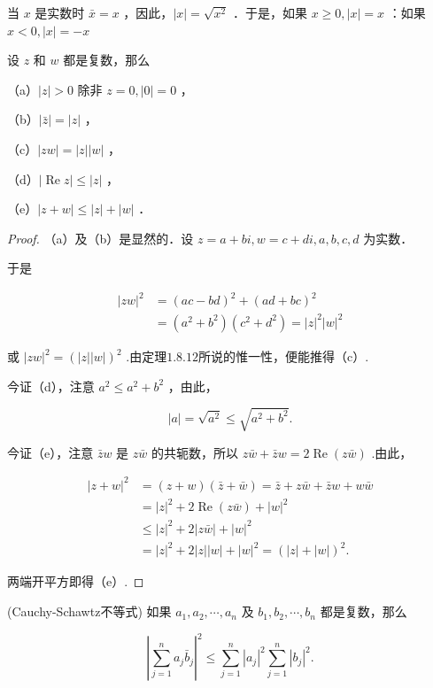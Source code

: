 \begin{remark}
	当 $x$ 是实数时 $\bar{x}=x$ ，因此，$|x|=\sqrt{x^2}$ ．于是，如果 $x \geqslant 0,|x|=x$ ：如果 $x<0,|x|=-x$
\end{remark} 
\begin{proposition}
		设 $z$ 和 $w$ 都是复数，那么
	
	（a）$|z|>0$ 除非 $z=0,|0|=0$ ，
	
	（b）$|\bar{z}|=|z|$ ，
	
	（c）$|z w|=|z||w|$ ，
	
	（d）$|\operatorname{Re} z| \leqslant|z|$ ，
	
	（e）$|z+w| \leqslant|z|+|w|$ ．
\end{proposition}

\begin{proof}
	（a）及（b）是显然的．设 $z=a+b i, w=c+d i, a, b, c, d$ 为实数．
	
	于是
	
	$$
	\begin{aligned}
		|z w|^2 & =(a c-b d)^2+(a d+b c)^2 \\
		& =\left(a^2+b^2\right)\left(c^2+d^2\right)=|z|^2|w|^2
	\end{aligned}
	$$
	
	
	或 $|z w|^2=(|z||w|)^2$ .由定理$1.8.12$所说的惟一性，便能推得（c）.
	
	今证（d），注意 $a^2 \leqslant a^2+b^2$ ，由此，
	
	$$
	|a|=\sqrt{a^2} \leqslant \sqrt{a^2+b^2} .
	$$
	
	
	今证（e），注意 $\bar{z} w$ 是 $z \bar{w}$ 的共轭数，所以 $z \bar{w}+\bar{z} w=2 \operatorname{Re}(z \bar{w})$ .由此，
	
	$$
	\begin{aligned}
		|z+w|^2 & =(z+w)(\bar{z}+\bar{w})=\bar{z}+z \bar{w}+\bar{z} w+w \bar{w} \\
		& =|z|^2+2 \operatorname{Re}(z \bar{w})+|w|^2 \\
		& \leqslant|z|^2+2|z \bar{w}|+|w|^2 \\
		& =|z|^2+2|z||w|+|w|^2=(|z|+|w|)^2 .
	\end{aligned}
	$$
	
	
	两端开平方即得（e）.
\end{proof}
\begin{proposition}
	(Cauchy-Schawtz不等式)
	如果 $a_1, a_2, \cdots, a_n$ 及 $b_1, b_2, \cdots, b_n$ 都是复数，那么
	
	$$
	\left|\sum_{j=1}^n a_j \bar{b}_j\right|^2 \leqslant \sum_{j=1}^n\left|a_j\right|^2 \sum_{j=1}^n\left|b_j\right|^2 .
	$$
	\label{Cauchy-Schawtz不等式}
\end{proposition}


